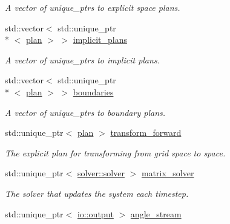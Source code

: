 \begin{DoxyCompactItemize}
\begin{DoxyCompactList}\small\item\em A vector of unique\-\_\-ptrs to explicit space plans. \end{DoxyCompactList}\item 
\hypertarget{classelement_1_1element_a78058a3fed0a625c5d4f025ebd44c83f}{std\-::vector$<$ std\-::unique\-\_\-ptr\\*
$<$ \hyperlink{classplan}{plan} $>$ $>$ \hyperlink{classelement_1_1element_a78058a3fed0a625c5d4f025ebd44c83f}{implicit\-\_\-plans}}\label{classelement_1_1element_a78058a3fed0a625c5d4f025ebd44c83f}

\begin{DoxyCompactList}\small\item\em A vector of unique\-\_\-ptrs to implicit plans. \end{DoxyCompactList}\item 
\hypertarget{classelement_1_1element_a66f8967810f632df8f3701b3004624b4}{std\-::vector$<$ std\-::unique\-\_\-ptr\\*
$<$ \hyperlink{classplan}{plan} $>$ $>$ \hyperlink{classelement_1_1element_a66f8967810f632df8f3701b3004624b4}{boundaries}}\label{classelement_1_1element_a66f8967810f632df8f3701b3004624b4}

\begin{DoxyCompactList}\small\item\em A vector of unique\-\_\-ptrs to boundary plans. \end{DoxyCompactList}\item 
\hypertarget{classelement_1_1element_af5eab156aef098e5efd95e8625d30bed}{std\-::unique\-\_\-ptr$<$ \hyperlink{classplan}{plan} $>$ \hyperlink{classelement_1_1element_af5eab156aef098e5efd95e8625d30bed}{transform\-\_\-forward}}\label{classelement_1_1element_af5eab156aef098e5efd95e8625d30bed}

\begin{DoxyCompactList}\small\item\em The explicit plan for transforming from grid space to space. \end{DoxyCompactList}\item 
\hypertarget{classelement_1_1element_a99bd235c956c6c40b6a08528f4310c85}{std\-::unique\-\_\-ptr$<$ \hyperlink{classsolver_1_1solver}{solver\-::solver} $>$ \hyperlink{classelement_1_1element_a99bd235c956c6c40b6a08528f4310c85}{matrix\-\_\-solver}}\label{classelement_1_1element_a99bd235c956c6c40b6a08528f4310c85}

\begin{DoxyCompactList}\small\item\em The solver that updates the system each timestep. \end{DoxyCompactList}\item 
\hypertarget{classelement_1_1element_a88e72ffe095917725f6e6f3bcf1e0587}{std\-::unique\-\_\-ptr$<$ \hyperlink{classio_1_1output}{io\-::output} $>$ \hyperlink{classelement_1_1element_a88e72ffe095917725f6e6f3bcf1e0587}{angle\-\_\-stream}}\label{classelement_1_1element_a88e72ffe095917725f6e6f3bcf1e0587}


\end{DoxyCompactItemize}
